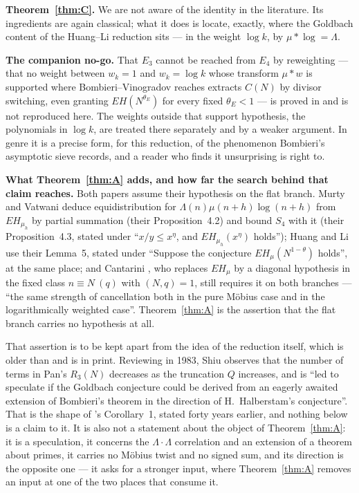 \documentclass[11pt,a4paper]{article}
\theoremstyle{plain}
\theoremstyle{definition}
\theoremstyle{remark}
\begin{document}
\medskip\noindent
\textbf{Theorem~\ref{thm:C}.} We are not aware of the identity in the
literature. Its ingredients are again classical; what it does is
locate, exactly, where the Goldbach content of the Huang--Li reduction
sits --- in the weight $\log k$, by $\mu*\log=\Lambda$.

\medskip\noindent
\textbf{The companion no-go.} That $E_3$ cannot be reached from $E_4$
by reweighting --- that no weight between $w_k=1$ and $w_k=\log k$
whose transform $\mu*w$ is supported where
Bombieri--Vinogradov reaches extracts $C(N)$ by divisor switching,
even granting $EH(N^{\theta_E})$ for every fixed $\theta_E<1$ --- is
proved in \cite{P2} and is not reproduced here. The weights outside
that support hypothesis, the polynomials in $\log k$, are treated
there separately and by a weaker argument. In genre it is a precise
form, for this reduction, of the phenomenon Bombieri's asymptotic
sieve \cite{Bom76} records, and a reader who finds it unsurprising is
right to.

\medskip\noindent
\textbf{What Theorem~\ref{thm:A} adds, and how far the search behind
that claim reaches.} Both papers assume their hypothesis on the flat
branch. Murty and Vatwani \cite{MV17} deduce equidistribution for
$\Lambda(n)\mu(n+h)\log(n+h)$ from $EH_{\mu_h}$ by partial summation
(their Proposition~4.2) and bound $S_4$ with it (their
Proposition~4.3, stated under ``$x/y\le x^{\eta}$, and
$EH_{\mu_h}(x^{\eta})$ holds''); Huang and Li \cite{HL} use their
Lemma~5, stated under ``Suppose the conjecture $EH_\mu(N^{1-\theta})$
holds'', at the same place; and Cantarini \cite{Can}, who replaces
$EH_\mu$ by a diagonal hypothesis in the fixed class
$n\equiv N\ (q)$ with $(N,q)=1$, still requires it on both branches ---
``the same strength of cancellation both in the pure M\"obius case and
in the logarithmically weighted case''. Theorem~\ref{thm:A} is the
assertion that the flat branch carries no hypothesis at all.

That assertion is to be kept apart from the idea of the reduction
itself, which is older than \cite{HL} and is in print. Reviewing
\cite{Pan} in 1983, Shiu \cite{Shiu} observes that the number of terms
in Pan's $R_3(N)$ decreases as the truncation $Q$ increases, and is
``led to speculate if the Goldbach conjecture could be derived from an
eagerly awaited extension of Bombieri's theorem in the direction of
H.~Halberstam's conjecture''. That is the shape of \cite{HL}'s
Corollary~1, stated forty years earlier, and nothing below is a claim
to it. It is also not a statement about the object of
Theorem~\ref{thm:A}: it is a speculation, it concerns the
$\Lambda\cdot\Lambda$ correlation and an extension of a theorem about
primes, it carries no M\"obius twist and no signed sum, and its
direction is the opposite one --- it asks for a stronger input, where
Theorem~\ref{thm:A} removes an input at one of the two places that
consume it.
\end{document}

